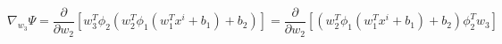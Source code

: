 \documentclass[12pt]{scrartcl}
\begin{document}
$$\nabla_{w_3}\Psi=\frac{\partial}{\partial w_2}[w_3^T\phi_2(w_2^T\phi_1(w_1^Tx^i+b_1)+b_2)]=\frac{\partial}{\partial w_2}[(w_2^T\phi_1(w_1^Tx^i+b_1)+b_2)\phi_2^Tw_3]$$

\begin{center}
\end{center}

\begin{center}
\end{center}

\begin{center}
\end{center}

\begin{center}
\end{center}
\end{document}
